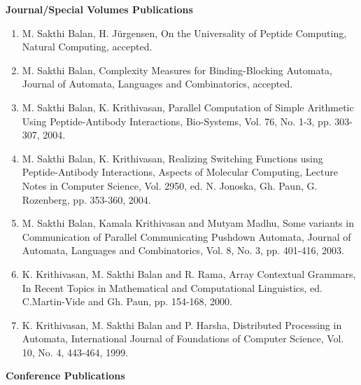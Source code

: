 \documentclass[11pt]{article}
\begin{document}
\vspace{0.4cm}


\vspace{0.2cm}

{\large \bf Journal/Special Volumes Publications}

\begin{enumerate}
\item M. Sakthi Balan, H. J\"{u}rgensen, On the Universality of
  Peptide Computing, Natural Computing, accepted.
\item M. Sakthi Balan, Complexity Measures for Binding-Blocking
Automata, Journal of Automata, Languages and Combinatorics, accepted.
\item M. Sakthi Balan, K. Krithivasan, Parallel Computation of Simple
Arithmetic Using Peptide-Antibody Interactions, Bio-Systems, Vol. 76,
No. 1-3, pp. 303-307, 2004.
\item M. Sakthi Balan, K. Krithivasan, Realizing Switching Functions
using Peptide-Antibody Interactions, Aspects of Molecular Computing,
Lecture Notes in Computer Science, Vol. 2950, ed. N. Jonoska,
Gh. Paun, G. Rozenberg, pp. 353-360, 2004.
\item M. Sakthi Balan, Kamala Krithivasan and Mutyam Madhu, Some
variants in Communication of Parallel Communicating Pushdown Automata,
Journal of Automata, Languages and Combinatorics, Vol. 8, No. 3,
pp. 401-416, 2003.
\item K. Krithivasan, M. Sakthi Balan and R. Rama, Array Contextual
Grammars, In Recent Topics in Mathematical and Computational
Linguistics, ed. C.Martin-Vide and Gh. Paun, pp. 154-168, 2000.
\item K. Krithivasan, M. Sakthi Balan and P. Harsha, Distributed
Processing in Automata, International Journal of Foundations of
Computer Science, Vol. 10, No. 4, 443-464, 1999.
\end{enumerate}

\vspace{0.2cm}

{\large \bf Conference Publications}
\end{document}
